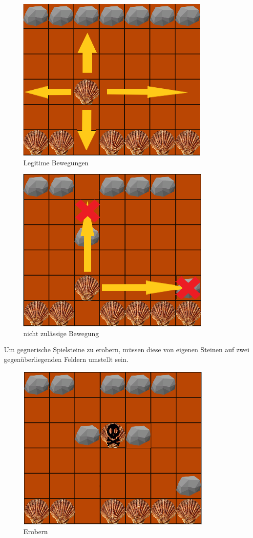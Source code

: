 \begin{figure}[h]
	\centering
	\includegraphics{img/regeln_bewegung2}
	\caption{Legitime Bewegungen}
	\label{fig:Bewegungen}
\end{figure}

\begin{figure}[h]
	\centering
	\includegraphics{img/regeln_nottodo}
	\caption{nicht zulässige Bewegung}
	\label{fig:nottodo}
\end{figure}

Um gegnerische Spielsteine zu erobern, müssen diese von eigenen Steinen auf zwei gegenüberliegenden Feldern umstellt sein.
\\
\begin{figure}[h]
	\centering
	\includegraphics{img/regeln_erobern}
	\caption{Erobern}
	\label{fig:erobern}
\end{figure}


